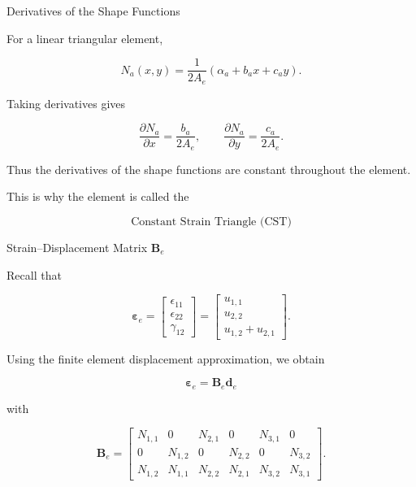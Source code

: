 \documentclass[aspectratio=169]{beamer}
\begin{document}
\begin{frame}{Derivatives of the Shape Functions}

For a linear triangular element,

\[
N_a(x,y)=\frac{1}{2A_e}\left(\alpha_a+b_a x+c_a y\right).
\]

Taking derivatives gives

\[
\frac{\partial N_a}{\partial x}=\frac{b_a}{2A_e},
\qquad
\frac{\partial N_a}{\partial y}=\frac{c_a}{2A_e}.
\]

Thus the derivatives of the shape functions are constant
throughout the element.

\bigskip

This is why the element is called the

\[
\boxed{\text{Constant Strain Triangle (CST)}}
\]

\end{frame}
\begin{frame}{Strain--Displacement Matrix \( \mathbf{B}_e \)}

Recall that

\[
\boldsymbol{\varepsilon}_e=
\begin{bmatrix}
\epsilon_{11}\\
\epsilon_{22}\\
\gamma_{12}
\end{bmatrix}
=
\begin{bmatrix}
u_{1,1}\\
u_{2,2}\\
u_{1,2}+u_{2,1}
\end{bmatrix}.
\]

Using the finite element displacement approximation, we obtain

\[
\boldsymbol{\varepsilon}_e=\mathbf{B}_e \mathbf{d}_e
\]

with

\[
\mathbf{B}_e=
\begin{bmatrix}
N_{1,1} & 0       & N_{2,1} & 0       & N_{3,1} & 0\\
0       & N_{1,2} & 0       & N_{2,2} & 0       & N_{3,2}\\
N_{1,2} & N_{1,1} & N_{2,2} & N_{2,1} & N_{3,2} & N_{3,1}
\end{bmatrix}.
\]

\end{frame}
\end{document}
